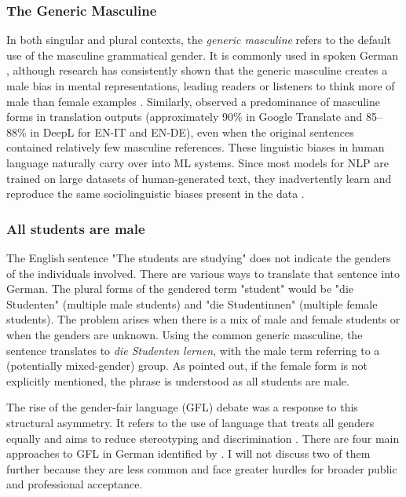 \subsubsection{The Generic Masculine}  
In both singular and plural contexts, the \textit{generic masculine} refers to the default use of the masculine grammatical gender. It is commonly used in spoken German \citep{lardelliBuildingBridgesDataset2024,schmitzGermanAllProfessors2022}, although research has consistently shown that the generic masculine creates a male bias in mental representations, leading readers or listeners to think more of male than female examples \citep{sczesnyCanGenderFairLanguage2016}. Similarly, \citet{rescignoGenderBiasMachine2023} observed a predominance of masculine forms in translation outputs (approximately 90\% in Google Translate and 85–88\% in DeepL for EN-IT and EN-DE), even when the original sentences contained relatively few masculine references. These linguistic biases in human language naturally carry over into ML systems. Since most models for NLP are trained on large datasets of human-generated text, they inadvertently learn and reproduce the same sociolinguistic biases present in the data \citep{choMeasuringGenderBias2019}.

\subsubsection{All students are male}
The English sentence "The students are studying" does not indicate the genders of the individuals involved. There are various ways to translate that sentence into German. The plural forms of the gendered term "student" would be "die Studenten" (multiple male students) and "die Studentinnen" (multiple female students). The problem arises when there is a mix of male and female students or when the genders are unknown. 
Using the common generic masculine, the sentence translates to \textit{die Studenten lernen}, with the male term referring to a (potentially mixed-gender) group. As \citet{schmitzGermanAllProfessors2022} pointed out, if the female form is not explicitly mentioned, the phrase is understood as all students are male.

The rise of the gender-fair language (GFL) debate was a response to this structural asymmetry. It refers to the use of language that treats all genders equally and aims to reduce stereotyping and discrimination \citep{sczesnyCanGenderFairLanguage2016}. 
There are four main approaches to GFL in German identified by \citet{lardelliBuildingBridgesDataset2024}. I will not discuss two of them further because they are less common and face greater hurdles for broader public and professional acceptance.

